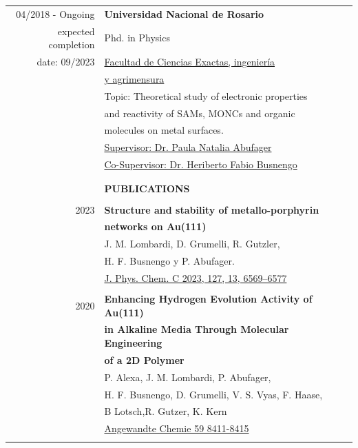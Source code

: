 \documentclass[11pt]{article}
\newcommand{\largespace}{\\[2pt]}
\newcommand{\mediumspace}{\\[-3pt]}
\newcommand{\smallspace}{\\[-5pt]}
\newcommand{\titlefont}[1]{\uppercase{\textbf{\Large{#1}}}}
\begin{document}
\begin{tcbposter}[
    poster = {columns=1, rows=1, spacing=0pt},
    boxes = {sharp corners, halign=center, valign=center, boxrule=0pt}
]
{\begin{tabular}{>{\footnotesize}rl}
        04/2018 - Ongoing  
        & \textbf{Universidad Nacional de Rosario} \\
            expected completion   & Phd. in Physics \\
          date: 09/2023   &  \href{https://web.fceia.unr.edu.ar/es/}{Facultad de Ciencias Exactas, ingeniería} \\ & \href{https://web.fceia.unr.edu.ar/es/}{y agrimensura} \\
            & Topic: Theoretical study of electronic properties  \\& and reactivity of SAMs, MONCs and organic \\& molecules on metal surfaces.  \\
            & \href{https://bit.ly/3OrhjK1}{Supervisor: Dr. Paula Natalia Abufager}\\
            & \href{https://bit.ly/43sSVMb}{Co-Supervisor: Dr. Heriberto Fabio Busnengo} \\
            & \smallspace
            & \largespace

            
        & \titlefont{Publications} \\
        \hline \mediumspace



        2023
            & \textbf{Structure and stability of metallo-porphyrin} \\ & \textbf{networks on Au(111)} \\
            & J. M. Lombardi, D. Grumelli, R. Gutzler, \\ & H. F. Busnengo y P. Abufager. \\
            & \href{https://doi.org/10.1021/acs.jpcc.3c00579}{J. Phys. Chem. C 2023, 127, 13, 6569–6577} \\
            & \smallspace


        2020
            & \textbf{Enhancing Hydrogen Evolution Activity of Au(111)} \\ & \textbf{in Alkaline Media Through Molecular Engineering} \\ & \textbf{of a 2D Polymer} \\
            & P. Alexa, J. M. Lombardi, P. Abufager, \\ & H. F. Busnengo, D. Grumelli, V. S. Vyas, F. Haase, \\ & B Lotsch,R. Gutzer, K. Kern \\
            & \href{https://doi.org/10.1002/anie.201915855}{Angewandte Chemie 59 8411-8415}  \\
            & \smallspace


\end{tabular}}
\end{tcbposter}
\end{document}
